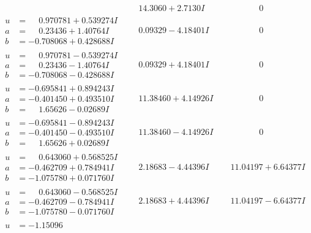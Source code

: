 \documentclass[1p]{elsarticle_modified}
\theoremstyle{definition}
\begin{document}
$$\begin{array}{c|c|c}
 & \phantom{-}14.3060 + 2.7130 I & \phantom{-0.000000 } 0 \\ \hline\begin{aligned}
u &= \phantom{-}0.970781 + 0.539274 I \\
a &= \phantom{-}0.23436 + 1.40764 I \\
b &= -0.708068 + 0.428688 I\end{aligned}
 & \phantom{-}0.09329 - 4.18401 I & \phantom{-0.000000 } 0 \\ \hline\begin{aligned}
u &= \phantom{-}0.970781 - 0.539274 I \\
a &= \phantom{-}0.23436 - 1.40764 I \\
b &= -0.708068 - 0.428688 I\end{aligned}
 & \phantom{-}0.09329 + 4.18401 I & \phantom{-0.000000 } 0 \\ \hline\begin{aligned}
u &= -0.695841 + 0.894243 I \\
a &= -0.401450 + 0.493510 I \\
b &= \phantom{-}1.65626 - 0.02689 I\end{aligned}
 & \phantom{-}11.38460 + 4.14926 I & \phantom{-0.000000 } 0 \\ \hline\begin{aligned}
u &= -0.695841 - 0.894243 I \\
a &= -0.401450 - 0.493510 I \\
b &= \phantom{-}1.65626 + 0.02689 I\end{aligned}
 & \phantom{-}11.38460 - 4.14926 I & \phantom{-0.000000 } 0 \\ \hline\begin{aligned}
u &= \phantom{-}0.643060 + 0.568525 I \\
a &= -0.462709 + 0.784941 I \\
b &= -1.075780 + 0.071760 I\end{aligned}
 & \phantom{-}2.18683 - 4.44396 I & \phantom{-}11.04197 + 6.64377 I \\ \hline\begin{aligned}
u &= \phantom{-}0.643060 - 0.568525 I \\
a &= -0.462709 - 0.784941 I \\
b &= -1.075780 - 0.071760 I\end{aligned}
 & \phantom{-}2.18683 + 4.44396 I & \phantom{-}11.04197 - 6.64377 I \\ \hline\begin{aligned}
u &= -1.15096\phantom{ +0.000000I} \\

\end{aligned}
\end{array}$$
\end{document}

